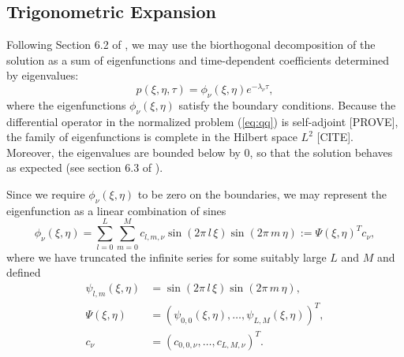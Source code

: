 \documentclass[10pt]{article}
\begin{document}
\subsection{Trigonometric Expansion}
Following Section 6.2 of \cite{risken1989fokker-planck}, we may use
the biorthogonal decomposition of the solution as a sum of
eigenfunctions and time-dependent coefficients determined by eigenvalues:
\begin{equation}
  p(\xi,\eta,\tau) = \phi_\nu(\xi,\eta) e^{-\lambda_\nu \tau}, \label{eq:biorthogonal}
\end{equation}
where the eigenfunctions $\phi_\nu(\xi, \eta)$ satisfy the boundary
conditions. Because the differential operator in the normalized
problem (\ref{eq:qq}) is self-adjoint [PROVE], the family of
eigenfunctions is complete in the Hilbert space $L^2$
[CITE]. Moreover, the eigenvalues are bounded below by 0, so
that the solution behaves as expected (see section 6.3 of
\cite{risken1989fokker-planck}).

Since we require $\phi_\nu(\xi,\eta)$ to be zero on the boundaries, we
may represent the eigenfunction as a linear combination of sines
\[
  \phi_\nu(\xi,\eta) = \sum_{l=0}^L \sum_{m=0}^M c_{l,m, \nu}
  \sin\left(2\pi\, l\, \xi \right) \sin\left(2\pi\, m\, \eta \right) := \Psi(\xi,\eta)^T c_\nu,
\]
where we have truncated the infinite series for some suitably large
$L$ and $M$ and defined
\begin{align*}
  \psi_{l,m}(\xi,\eta) &= \sin\left(2\pi\, l\, \xi \right)
                         \sin\left(2\pi\, m\, \eta \right), \\
  \Psi(\xi,\eta) &= (\psi_{0,0}(\xi,\eta), \ldots, \psi_{L,M}(\xi,\eta))^T, \\
  c_\nu &= (c_{0,0,\nu}, \ldots, c_{L,M,\nu})^T.
\end{align*}
\end{document}
